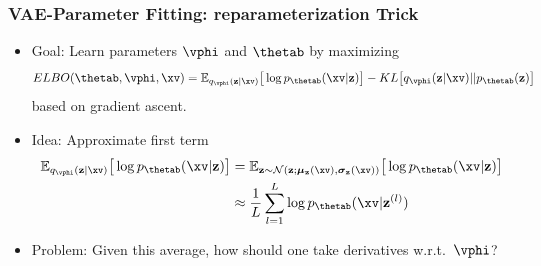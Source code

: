 \begin{frame}
\frametitle{VAE-Parameter Fitting: reparameterization Trick}
\begin{itemize}
\item Goal: Learn parameters $\vphi$ and $\thetab$ by maximizing %
\begin{equation*}
ELBO(\thetab, \vphi, \xv) = \mathbb{E}_{q_{\vphi}(\mathbf{z}|\xv)}\big[ \log p_{\thetab}(\xv|\mathbf{z}) \big] - KL\big[ q_{\vphi}(\mathbf{z}|\xv) ||  p_{\thetab}(\mathbf{z}) \big]
\end{equation*}
based on gradient ascent.
\item Idea: Approximate first term
\begin{align*}
\mathbb{E}_{q_{\vphi}(\mathbf{z}|\xv)}\big[ \log p_{\thetab}(\xv|\mathbf{z}) \big] &= \mathbb{E}_{\mathbf{z} \sim \mathcal{N}(\mathbf{z}; \bm{\mu}_{\mathbf{z}}(\xv), \bm{\sigma}_{\mathbf{z}}(\xv))}\big[ \log p_{\thetab}(\xv|\mathbf{z}) \big]\\
&\approx \frac{1}{L} \sum_{l=1}^{L} \log p_{\thetab}(\xv|\mathbf{z}^{(l)})
\end{align*}
\item  Problem:
Given this average,
how should one take derivatives
    w.r.t.~$\vphi$?
\end{itemize}

\end{frame}


